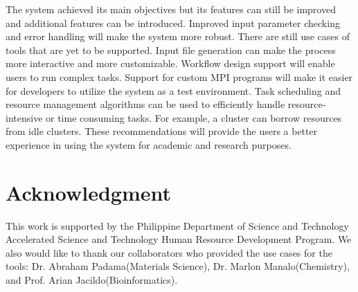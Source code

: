 The system achieved its main objectives but its features can still be improved and additional features can be introduced. Improved input parameter checking and error handling will make the system more robust. There are still use cases of tools that are yet to be supported. Input file generation can make the process more interactive and more customizable.  Workflow design support will enable users to run complex tasks. Support for custom MPI programs will make it easier for developers to utilize the system as a test environment. Task scheduling and resource management algorithms can be used to efficiently handle resource-intensive or time consuming tasks. For example, a cluster can borrow resources from idle clusters. These recommendations will provide the users a better experience in using the system for academic and research purposes. 




\section*{Acknowledgment}
This work is supported by the Philippine Department of Science and Technology Accelerated Science and Technology Human Resource Development Program. We also would like to thank our collaborators who provided the use cases for the tools: Dr. Abraham Padama(Materials Science), Dr. Marlon Manalo(Chemistry), and Prof. Arian Jacildo(Bioinformatics).




